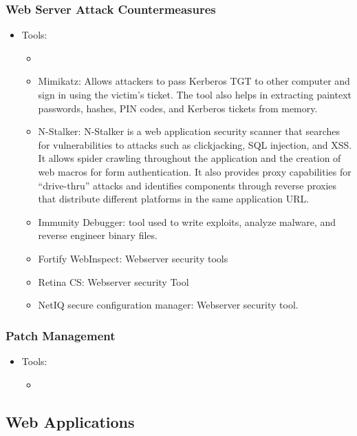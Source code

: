 \subsubsection{Web Server Attack Countermeasures}
\begin{itemize}
    \item Tools:
    \begin{itemize}
        \item \item Mimikatz: Allows attackers to pass Kerberos TGT to other computer and sign in using the victim's ticket. The tool also helps in extracting paintext passwords, hashes, PIN codes, and Kerberos tickets from memory.
        \item N-Stalker: N-Stalker is a web application security scanner that searches for vulnerabilities to attacks such as clickjacking, SQL injection, and XSS. It allows spider crawling throughout the application and the creation of web macros for form authentication. It also provides proxy capabilities for “drive-thru” attacks and identifies components through reverse proxies that distribute different platforms in the same application URL.
        \item Immunity Debugger: tool used to write exploits, analyze malware, and reverse engineer binary files.
        \item Fortify WebInspect: Webserver security tools
        \item Retina CS: Webserver security Tool
        \item NetIQ secure configuration manager: Webserver security tool.
    \end{itemize}
\end{itemize}
\subsubsection{Patch Management}
\begin{itemize}
    \item Tools:
    \begin{itemize}
        \item 
    \end{itemize}
\end{itemize}


\subsection{Web Applications}
